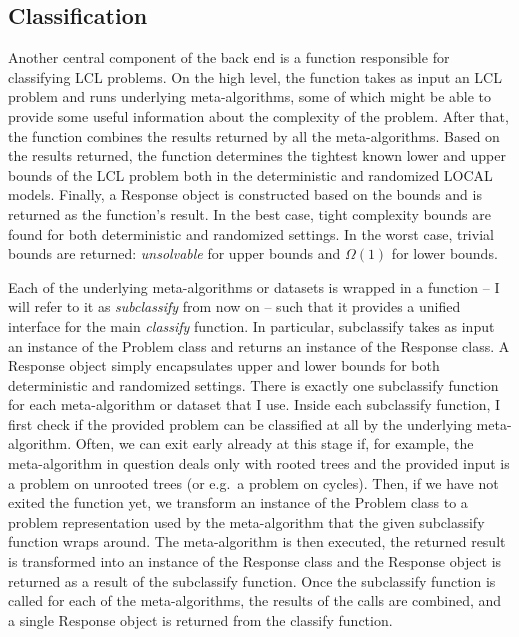 \subsection{Classification}

Another central component of the back end is
a function responsible for classifying LCL problems.
On the high level, the function takes as input an LCL problem and
runs underlying meta-algorithms, some of which might be
able to provide some useful information about the complexity of the
problem. After that, the function combines the results
returned by all the meta-algorithms. Based on the results returned,
the function determines the tightest known lower and upper bounds of
the LCL problem both in the deterministic and randomized LOCAL
models. Finally, a Response object is constructed based on the bounds
and is returned as the function's result. In the best case, tight
complexity bounds are found for both deterministic and randomized
settings. In the worst case, trivial bounds are returned:
\emph{unsolvable} for upper bounds and $\Omega(1)$ for lower bounds.

Each of the underlying meta-algorithms or datasets is wrapped
in a function -- I will refer to it as \emph{subclassify} from now on -- such
that it provides a unified interface for the main
\emph{classify} function. In particular, subclassify takes
as input an instance of the Problem class and
returns an instance of the Response class. A Response object
simply encapsulates upper and lower bounds for both
deterministic and randomized settings. There is
exactly one subclassify function for each meta-algorithm
or dataset that I use. Inside each subclassify function,
I first check if the provided problem can be classified
at all by the underlying meta-algorithm. Often, we can
exit early already at this stage if, for example, the meta-algorithm
in question deals only with rooted trees and the provided input is a 
problem on unrooted trees (or e.g.\ a problem on cycles). Then,
if we have not exited the function yet,
we transform an instance of the Problem class to a problem
representation used by the meta-algorithm that the given
subclassify function wraps around. The meta-algorithm is then executed,
the returned result is transformed into an instance of the
Response class and the Response object is returned as
a result of the subclassify function. Once the subclassify
function is called for each of the meta-algorithms,
the results of the calls are combined, and
a single Response object is returned from the
classify function.


